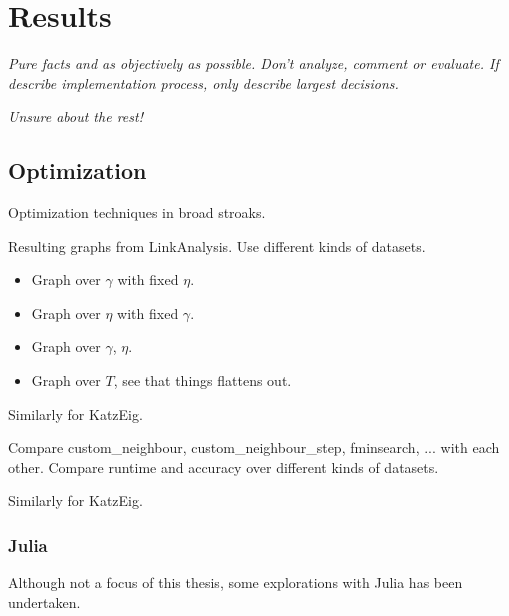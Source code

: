 \chapter{Results}\label{cha:Results}

\textit{Pure facts and as objectively as possible. Don't analyze, comment or evaluate.  If describe implementation process, only describe largest decisions.}


%
%

\textit{Unsure about the rest!}

\section{Optimization}\label{sec:res:opt}

Optimization techniques in broad stroaks.

Resulting graphs from LinkAnalysis. Use different kinds of datasets.

\begin{itemize}
    \item Graph over $\gamma$ with fixed $\eta$.
    \item Graph over $\eta$ with fixed $\gamma$.
    \item Graph over $\gamma$, $\eta$.
    \item Graph over $T$, see that things flattens out.
\end{itemize}

Similarly for KatzEig.


Compare custom\_neighbour, custom\_neighbour\_step, fminsearch, ... with each other. Compare runtime and accuracy over different kinds of datasets.

Similarly for KatzEig.



\subsection{Julia}\label{subsec:res:julia}


Although not a focus of this thesis, some explorations with Julia has been undertaken.


%
%
%
